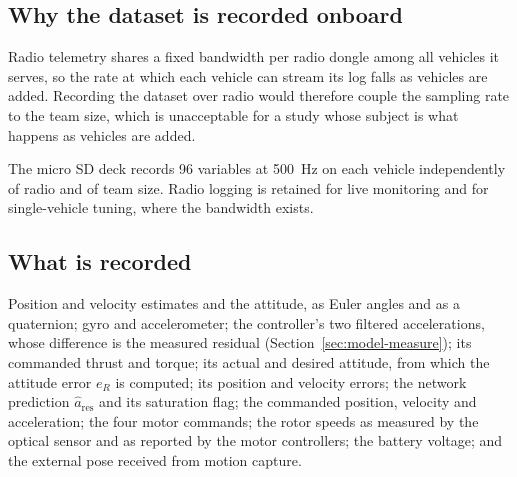 \subsection{Why the dataset is recorded onboard}

Radio telemetry shares a fixed bandwidth per radio dongle among all vehicles it serves, so the rate
at which each vehicle can stream its log falls as vehicles are added. Recording the dataset over
radio would therefore couple the sampling rate to the team size, which is unacceptable for a study
whose subject is what happens as vehicles are added.

The micro SD deck records \num{96} variables at \SI{500}{\hertz} on each vehicle independently of
radio and of team size. Radio logging is retained for live monitoring and for single-vehicle
tuning, where the bandwidth exists.

\subsection{What is recorded}
\label{sec:setup-recorded}

Position and velocity estimates and the attitude, as Euler angles and as a quaternion; gyro and
accelerometer; the controller's two filtered accelerations, whose difference is the measured
residual (Section~\ref{sec:model-measure}); its commanded thrust and torque; its actual and desired
attitude, from which the attitude error $e_R$ is computed; its position and velocity errors; the
network prediction $\hat{a}_{\mathrm{res}}$ and its saturation flag; the commanded position,
velocity and acceleration; the four motor commands; the rotor speeds as measured by the optical
sensor and as reported by the motor controllers; the battery voltage; and the external pose
received from motion capture.

